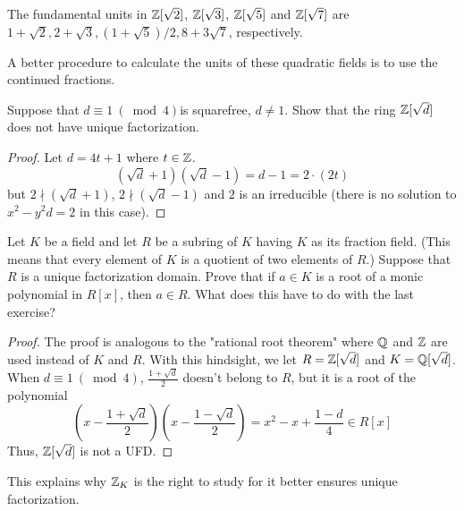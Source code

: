\documentclass[12pt,twoside=semi,openright,numbers=noenddot]{scrbook}
\begin{document}
    \begin{example}
        The fundamental units in $\mathbb Z[\sqrt{2}]$, $\mathbb Z[\sqrt{3}]$, $\mathbb Z[\sqrt{5}]$ and $\mathbb Z[\sqrt{7}]$ are 
        $1+\sqrt{2}, 2+\sqrt{3}, (1+\sqrt{5})/2, 8+3\sqrt{7}$, respectively.
    \end{example}
    \begin{remark}
        A better procedure to calculate the units of these quadratic fields is to use the continued fractions.
    \end{remark}
\begin{problem}
    Suppose that $d \equiv 1 \ (\bmod 4) $is squarefree, $d \neq 1$. Show that the ring $\mathbb Z[\sqrt{d}]$ does not have
    unique factorization.
\end{problem}
    \begin{proof}
        Let $d = 4t+1$ where $t \in \mathbb Z$.
        $$(\sqrt{d}+1)(\sqrt{d}-1) = d - 1 = 2 \cdot (2t)$$
        but $ 2 \nmid (\sqrt{d}+1)$, $2 \nmid (\sqrt{d}-1)$ and $2$ is an irreducible (there is no solution to $x^2-y^2d = 2$ in this case).
    \end{proof}

\begin{problem}
    Let $K$ be a field and let $R$ be a subring of $K$ having $K$ as its fraction field. 
    (This means that every element of $K$ is a quotient of two elements of $R$.) 
    Suppose that $R$ is a unique factorization domain. Prove that if $a \in K$ is a root of a monic polynomial in $R[x]$,
    then $a \in R$. What does this have to do with the last exercise?
\end{problem}
    \begin{proof}
        The proof is analogous to the "rational root theorem" where $\mathbb Q$ and $\mathbb Z$ are used instead of $K$ and $R$.
        With this hindsight, we let $R = \mathbb Z[\sqrt{d}]$ and $K = \mathbb Q[\sqrt{d}]$. 
        When $d \equiv 1 \ (\bmod 4)$, $\frac{1+\sqrt{d}}{2}$ doesn't belong to $R$, but it is a root of 
        the polynomial 
        $$ \left(x-\frac{1+\sqrt{d}}{2}\right)\left(x-\frac{1-\sqrt{d}}{2}\right) = x^2-x+\frac{1-d}{4} \in R[x] $$
        Thus, $\mathbb Z[\sqrt{d}]$ is not a UFD.
    \end{proof}
    \begin{remark}
        This explains why $\mathbb Z_K$ is the right to study for it better ensures unique factorization.
    \end{remark}
\end{document}
